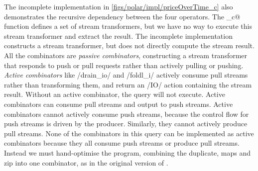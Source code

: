 The incomplete implementation in \cref{figs/polar/impl/priceOverTime_c} also demonstrates the recursive dependency between the four operators.
The \Hs@priceOverTime_c@ function defines a set of stream transformers, but we have no way to execute this stream transformer and extract the result.
The incomplete implementation constructs a stream transformer, but does not directly compute the stream result.
All the combinators are \emph{passive combinators}, constructing a stream transformer that responds to push or pull requests rather than actively pulling or pushing.
\emph{Active combinators} like \Hs/drain_io/ and \Hs/foldl_i/ actively consume pull streams rather than transforming them, and return an \Hs/IO/ action containing the stream result.
Without an active combinator, the query will not execute.
Active combinators can consume pull streams and output to push streams.
Active combinators cannot actively consume push streams, because the control flow for push streams is driven by the producer.
Similarly, they cannot actively produce pull streams.
None of the combinators in this query can be implemented as active combinators because they all consume push streams or produce pull streams.
Instead we must hand-optimise the program, combining the duplicate, maps and zip into one combinator, as in the original version of \Hs@priceOverTime@.


% 
% 
% 
% 
% 

